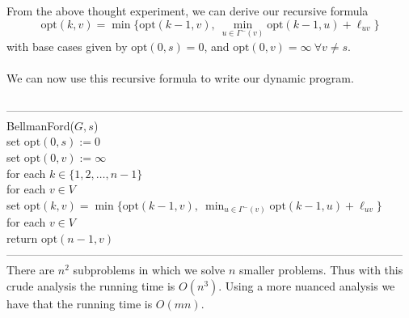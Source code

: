 \documentclass{article}
\newcommand{\Ga}{\Gamma}
\newcommand{\opt}{\text{opt}}
\begin{document}
From the above thought experiment, we can derive our recursive formula
\[\opt(k, v) = \min\Big\{\opt(k-1, v),\ \min_{u \in \Ga^-(v)} \opt(k-1, u) + \ell_{uv}\Big\}\]
with base cases given by $\opt(0, s) = 0$, and $\opt(0, v) = \infty\ \forall v \neq s$.\\\\
We can now use this recursive formula to write our dynamic program.\\\\
---------------------------------------------------------------------------------------------------------
BellmanFord($G, s$)\\
	\hspace*{7mm} set $\opt(0, s) := 0$\\
	\hspace*{7mm} set $\opt(0, v) := \infty$\\
	\hspace*{7mm} for each $k \in \{1, 2, \dots, n-1\}$\\
	\hspace*{14mm} for each $v \in V$\\
	\hspace*{21mm} set $\opt(k, v) = \min\Big\{\opt(k-1, v),\ \min_{u \in \Ga^-(v)} \opt(k-1, u) + \ell_{uv}\Big\}$\\
	\hspace*{7mm} for each $v \in V$\\
	\hspace*{14mm} return $\opt(n-1, v)$\\
---------------------------------------------------------------------------------------------------------\\
There are $n^2$ subproblems in which we solve $n$ smaller problems. Thus with this crude analysis the running time is $O(n^3)$. Using a more nuanced analysis we have that the running time is $O(mn)$.
\end{document}
